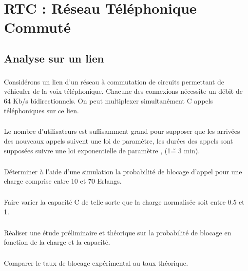 
\chapter{RTC : Réseau Téléphonique Commuté}

    \section{Analyse sur un lien}

        \paragraph{}
        Considérons un lien d'un réseau à commutation de circuits permettant de véhiculer de la voix téléphonique. Chacune des connexions nécessite un débit de 64 Kb/s bidirectionnels. On peut multiplexer simultanément C appels téléphoniques sur ce lien.
        
        \paragraph{}
        Le nombre d'utilisateurs est suffisamment grand pour supposer que les arrivées des nouveaux appels suivent une loi de paramètre, les durées des appels sont supposées suivre une loi exponentielle de paramètre , (1\u = 3 min).
        
        \paragraph{}
        Déterminer à l'aide d'une simulation la probabilité de blocage d'appel pour une charge comprise entre 10 et 70 Erlangs.
        
        \paragraph{}
        Faire varier la capacité C de telle sorte que la charge normalisée soit entre 0.5 et 1.

        \paragraph{}
        Réaliser une étude préliminaire et théorique sur la probabilité de blocage en fonction de la charge et la capacité.
        
        \paragraph{}
        Comparer le taux de blocage expérimental au taux théorique.


